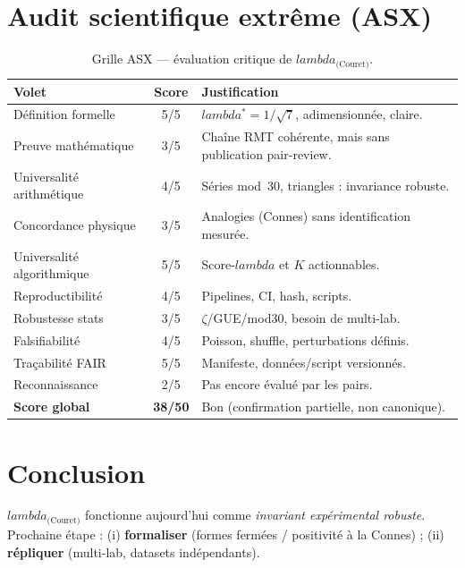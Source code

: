 \documentclass[11pt,a4paper]{article}
\def\lambda{lambda}%
\begin{document}
\section{Audit scientifique extrême (ASX)}
\begin{table}[h]
\centering
\small
\begin{tabular}{p{4.8cm} c p{9cm}}
\toprule
\textbf{Volet} & \textbf{Score} & \textbf{Justification}\\ \midrule
Définition formelle & 5/5 & $\lambda^\ast = 1/\sqrt{7}$, adimensionnée, claire.\\
Preuve mathématique & 3/5 & Chaîne RMT cohérente, mais sans publication pair-review.\\
Universalité arithmétique & 4/5 & Séries mod~30, triangles : invariance robuste.\\
Concordance physique & 3/5 & Analogies (Connes) sans identification mesurée.\\
Universalité algorithmique & 5/5 & Score-$\lambda$ et $K$ actionnables.\\
Reproductibilité & 4/5 & Pipelines, CI, hash, scripts.\\
Robustesse stats & 3/5 & $ζ$/GUE/mod30, besoin de multi-lab.\\
Falsifiabilité & 4/5 & Poisson, shuffle, perturbations définis.\\
Traçabilité FAIR & 5/5 & Manifeste, données/script versionnés.\\
Reconnaissance & 2/5 & Pas encore évalué par les pairs.\\ \midrule
\textbf{Score global} & \textbf{38/50} & Bon (confirmation partielle, non canonique).\\
\bottomrule
\end{tabular}
\caption{Grille ASX — évaluation critique de $\lambda_{\text{(Couret)}}$.}
\end{table}

\section{Conclusion}
$\lambda_{\text{(Couret)}}$ fonctionne aujourd’hui comme \emph{invariant expérimental robuste}.
Prochaine étape : (i) \textbf{formaliser} (formes fermées / positivité \`a la Connes) ; (ii) \textbf{répliquer} (multi-lab, datasets indépendants).
\end{document}
